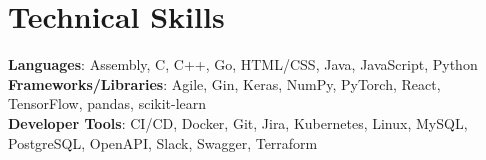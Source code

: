 \documentclass[letterpaper,11pt]{article}
\makeatletter
\newcommand{\resumeItem}[1]{
    \item\small{
      {#1 \vspace{-2pt}}
    }
  }
\newcommand{\resumeProjectHeading}[2]{
      \item
      \begin{tabular*}{0.97\textwidth}{l@{\extracolsep{\fill}}r}
        \small#1 & #2 \\
      \end{tabular*}\vspace{-7pt}
  }
\newcommand{\resumeSubHeadingListStart}{\begin{itemize}[leftmargin=0.15in, label={}]}
\newcommand{\resumeSubHeadingListEnd}{\end{itemize}}
\newcommand{\resumeItemListStart}{\begin{itemize}}
\newcommand{\resumeItemListEnd}{\end{itemize}\vspace{-5pt}}
\makeatother
\begin{document}

\section{Technical Skills}

  \begin{itemize}[leftmargin=0.15in, label={}]
    \small{\item{
      \textbf{Languages}{: Assembly, C, C++, Go, HTML/CSS, Java, JavaScript, Python} \\
      \textbf{Frameworks/Libraries}{: Agile, Gin, Keras, NumPy, PyTorch, React, TensorFlow, pandas, scikit-learn} \\
      \textbf{Developer Tools}{: CI/CD, Docker, Git, Jira, Kubernetes, Linux, MySQL, PostgreSQL, OpenAPI, Slack, Swagger, Terraform}}}
  \end{itemize}
\end{document}
